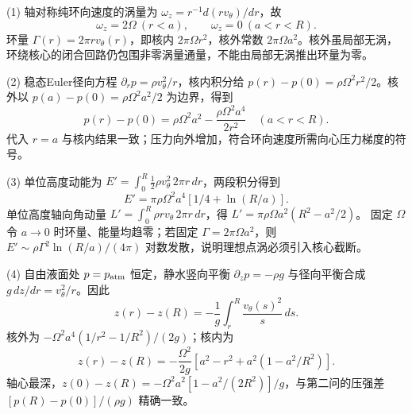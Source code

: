 (1) 轴对称纯环向速度的涡量为 \(\omega_z=r^{-1}d(rv_\theta)/dr\)，故
\[
\boxed{\omega_z=2\Omega\ (r<a),\qquad\omega_z=0\ (a<r<R)}.
\]
环量 \(\Gamma(r)=2\pi r v_\theta(r)\)，即核内 \(2\pi\Omega r^2\)，核外常数 \(2\pi\Omega a^2\)。核外虽局部无涡，环绕核心的闭合回路仍包围非零涡量通量，不能由局部无涡推出环量为零。

(2) 稳态Euler径向方程 \(\partial_r p=\rho v_\theta^2/r\)，核内积分给
\(p(r)-p(0)=\rho\Omega^2r^2/2\)。核外以 \(p(a)-p(0)=\rho\Omega^2a^2/2\) 为边界，得到
\[
\boxed{p(r)-p(0)=\rho\Omega^2a^2
-\frac{\rho\Omega^2a^4}{2r^2}\quad(a<r<R)}.
\]
代入 \(r=a\) 与核内结果一致；压力向外增加，符合环向速度所需向心压力梯度的符号。

(3) 单位高度动能为 \(E'=\int_0^R\tfrac12\rho v_\theta^2\,2\pi r\,dr\)，两段积分得到
\[
\boxed{E'=\pi\rho\Omega^2a^4[1/4+\ln(R/a)]}.
\]
单位高度轴向角动量 \(L'=\int_0^R\rho r v_\theta\,2\pi r\,dr\)，得
\(\boxed{L'=\pi\rho\Omega a^2(R^2-a^2/2)}\)。
固定 \(\Omega\) 令 \(a\to0\) 时环量、能量均趋零；若固定 \(\Gamma=2\pi\Omega a^2\)，则 \(E'\sim\rho\Gamma^2\ln(R/a)/(4\pi)\) 对数发散，说明理想点涡必须引入核心截断。

(4) 自由液面处 \(p=p_{\rm atm}\) 恒定，静水竖向平衡 \(\partial_zp=-\rho g\) 与径向平衡合成
\(g\,dz/dr=v_\theta^2/r\)。因此
\[
z(r)-z(R)=-\frac1g\int_r^R\frac{v_\theta(s)^2}{s}\,ds .
\]
核外为 \(-\Omega^2a^4(1/r^2-1/R^2)/(2g)\)；核内为
\[
z(r)-z(R)=-\frac{\Omega^2}{2g}
[a^2-r^2+a^2(1-a^2/R^2)] .
\]
轴心最深，\(z(0)-z(R)=-\Omega^2a^2[1-a^2/(2R^2)]/g\)，与第二问的压强差 \([p(R)-p(0)]/(\rho g)\) 精确一致。
